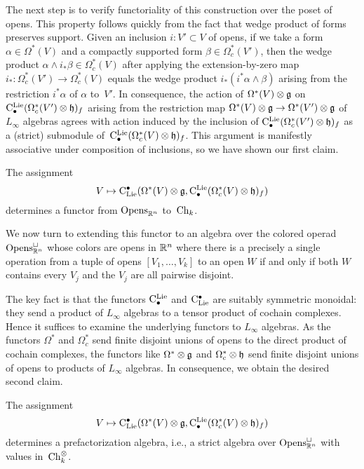 \documentclass[11pt]{amsart}
\numberwithin{equation}{section}
\begin{document}
The next step is to verify functoriality of this construction over the poset of opens.
This property follows quickly from the fact that wedge product of forms preserves support.
Given an inclusion $i: V' \subset V$ of opens, if we take a form $\alpha \in \Omega^*(V)$ and a compactly supported form $\beta \in \Omega^*_c(V')$, then the wedge product $\alpha \wedge i_* \beta \in \Omega^*_c(V)$ after applying the extension-by-zero map $i_*: \Omega^*_c(V') \to \Omega^*_c(V)$ equals the wedge product $i_*(i^*\alpha \wedge \beta)$ arising from the restriction $i^* \alpha$ of $\alpha$ to~$V'$.
In consequence, the action of $\Omega^*(V) \otimes \mathfrak g$ on ${\rm C}^{\rm Lie}_\bullet(\Omega^*_c(V') \otimes \mathfrak h)_f$ arising from the restriction map $\Omega^*(V) \otimes \mathfrak g \to \Omega^*(V') \otimes \mathfrak g$ of $L_\infty$ algebras agrees with action induced by the inclusion of ${\rm C}^{\rm Lie}_\bullet(\Omega^*_c(V') \otimes \mathfrak h)_f$ as a (strict) submodule of~${\rm C}^{\rm Lie}_\bullet(\Omega^*_c(V) \otimes \mathfrak h)_f$.
This argument is manifestly associative under composition of inclusions, so we have shown our first claim.

\begin{lmm}
The assignment
\[
V \mapsto {\rm C}_{\rm Lie}^\bullet(\Omega^*(V) \otimes \mathfrak g, {\rm C}^{\rm Lie}_\bullet(\Omega^*_c(V) \otimes \mathfrak h)_f)
\]
determines a functor from ${\rm Opens}_{\mathbb R^n}$ to~${\rm Ch}_k$.
\end{lmm}

We now turn to extending this functor to an algebra over the colored operad ${\rm Opens}_{\mathbb R^n}^\sqcup$ whose colors are opens in $\mathbb R^n$ where there is a precisely a single operation from a tuple of opens $[V_1,\ldots,V_k]$ to an open $W$ if and only if both $W$ contains every $V_j$ and the $V_j$ are all pairwise disjoint.

The key fact is that the functors ${\rm C}^{\rm Lie}_\bullet$ and ${\rm C}_{\rm Lie}^\bullet$ are suitably symmetric monoidal:
they send a product of $L_\infty$ algebras to a tensor product of cochain complexes.
Hence it suffices to examine the underlying functors to $L_\infty$ algebras.
As the functors $\Omega^*$ and $\Omega^*_c$ send finite disjoint unions of opens to the direct product of cochain complexes, 
the functors like $\Omega^* \otimes \mathfrak g$ and $\Omega^*_c \otimes \mathfrak h$ send finite disjoint unions of opens to products of $L_\infty$ algebras.
In consequence, we obtain the desired second claim.

\begin{lmm}
The assignment
\[
V \mapsto {\rm C}_{\rm Lie}^\bullet(\Omega^*(V) \otimes \mathfrak g, {\rm C}^{\rm Lie}_\bullet(\Omega^*_c(V) \otimes \mathfrak h)_f)
\]
determines a prefactorization algebra, i.e., a strict algebra over ${\rm Opens}_{\mathbb R^n}^\sqcup$ with values in~${\rm Ch}_k^\otimes$.
\end{lmm}
\end{document}
